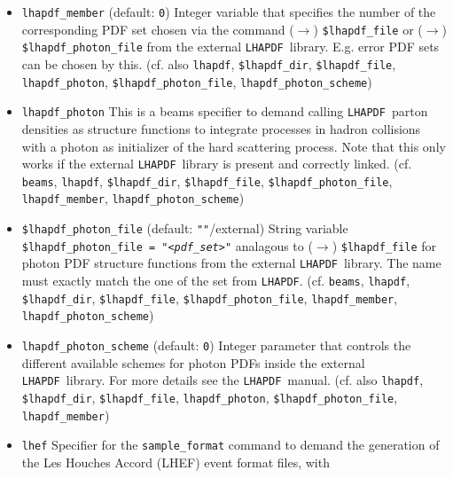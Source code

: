 \documentclass[12pt]{book}
\newcommand{\ttt}[1]{\texttt{#1}}
\newcommand{\lhapdf}{\texttt{LHAPDF}}
\begin{document}
\begin{itemize}
\newline
If the external libraries \lhapdf\ and \ttt{HOPPET} are correctly
linked, this allows to switch on the matching for 4-/5-flavor schemes
for $b$-initiated processes at hadron colliders.
\item
\ttt{lhapdf\_member} \qquad (default: \ttt{0}) \newline
Integer variable that specifies the number of the corresponding PDF
set chosen via the command ($\to$) \ttt{\$lhapdf\_file} or ($\to$)
\ttt{\$lhapdf\_photon\_file} from the external \lhapdf\
library. E.g. error PDF sets can be chosen by this. (cf. also
\ttt{lhapdf}, \ttt{\$lhapdf\_dir}, \ttt{\$lhapdf\_file},
\ttt{lhapdf\_photon}, \ttt{\$lhapdf\_photon\_file},
\ttt{lhapdf\_photon\_scheme}) 
\item
\ttt{lhapdf\_photon} \newline
This is a beams specifier to demand calling \lhapdf\ parton densities as
structure functions to integrate processes in hadron collisions with a
photon as initializer of the hard scattering process. Note
that this only works if the external \lhapdf\ library is present and
correctly linked. (cf. \ttt{beams}, \ttt{lhapdf}, \ttt{\$lhapdf\_dir},
\ttt{\$lhapdf\_file}, \ttt{\$lhapdf\_photon\_file},
\ttt{lhapdf\_member}, \ttt{lhapdf\_photon\_scheme})
\item
\ttt{\$lhapdf\_photon\_file} \qquad (default: \ttt{""}/external) \newline
String variable \ttt{\$lhapdf\_photon\_file = "{\em <pdf\_set>}"} 
analagous to ($\to$) \ttt{\$lhapdf\_file} 
for photon PDF structure functions from the external \lhapdf\
library. The name must exactly match the one of the set from \lhapdf. 
(cf. \ttt{beams}, \ttt{lhapdf}, \ttt{\$lhapdf\_dir},
\ttt{\$lhapdf\_file}, \ttt{\$lhapdf\_photon\_file},
\ttt{lhapdf\_member}, \ttt{lhapdf\_photon\_scheme})
\item
\ttt{lhapdf\_photon\_scheme} \qquad (default: \ttt{0}) \newline
Integer parameter that controls the different available schemes for
photon PDFs inside the external \lhapdf\ library. For more details see
the \lhapdf\ manual.  (cf. also
\ttt{lhapdf}, \ttt{\$lhapdf\_dir}, \ttt{\$lhapdf\_file},
\ttt{lhapdf\_photon}, \ttt{\$lhapdf\_photon\_file},
\ttt{lhapdf\_member}) 
\item
\ttt{lhef} \newline 
Specifier for the \ttt{sample\_format} command to demand the
generation of the Les Houches Accord (LHEF) event format files, with

\end{itemize}
\end{document}
